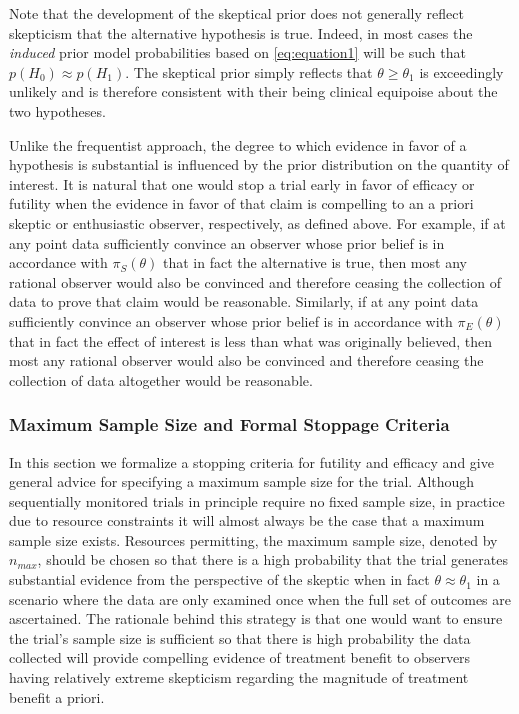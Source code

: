 \documentclass[useAMS,usenatbib,referee]{biom}
\begin{document}
Note that the development of the skeptical prior does not generally reflect skepticism that the alternative hypothesis is true. 
%
Indeed, in most cases the \textit{induced} prior model probabilities based on \eqref{eq:equation1} will be such that $p(H_0) \approx p(H_1)$.
%
The skeptical prior simply reflects that $\theta \ge \theta_1$ is exceedingly unlikely and is therefore 
consistent with their being clinical equipoise about the two hypotheses.
%

Unlike the frequentist approach, the degree to which evidence in favor of a hypothesis is substantial is influenced by 
the prior distribution on the quantity of interest.
%
It is natural that one would stop a trial early in favor of efficacy or futility when the evidence in favor of that claim is compelling
to an a priori skeptic or enthusiastic observer, respectively, as defined above.
%
For example, if at any point data sufficiently convince an observer whose prior belief is in accordance with $\pi_{S}(\theta)$ that in fact
the alternative is true, then most any rational observer would also be convinced and therefore ceasing the collection of data
to prove that claim would be reasonable.
%
Similarly, if at any point data sufficiently convince an observer whose prior belief is in accordance with $\pi_{E}(\theta)$ that in fact
the effect of interest is less than what was originally believed, then most any rational observer would also be convinced and therefore ceasing 
the collection of data altogether would be reasonable.

\subsubsection{Maximum Sample Size and Formal Stoppage Criteria}
In this section we formalize a stopping criteria for futility and efficacy and give general 
advice for specifying a maximum sample size for the trial.
%
Although sequentially monitored trials in principle require no fixed sample size, in practice due to resource 
constraints it will almost always be the case that a maximum sample size exists. 
%
Resources permitting, the maximum sample size, denoted by $n_{max}$, should be chosen so that there is a 
high probability that the trial generates substantial evidence from the perspective of the skeptic when in 
fact $\theta \approx \theta_1$ in a scenario where the data are only examined once when the full set of 
outcomes are ascertained.
%
The rationale behind this strategy is that one would want to ensure the trial's sample size is sufficient so that
there is high probability the data collected will provide compelling evidence of treatment benefit to observers 
having relatively extreme skepticism regarding the magnitude of treatment benefit a priori.  
\end{document}
